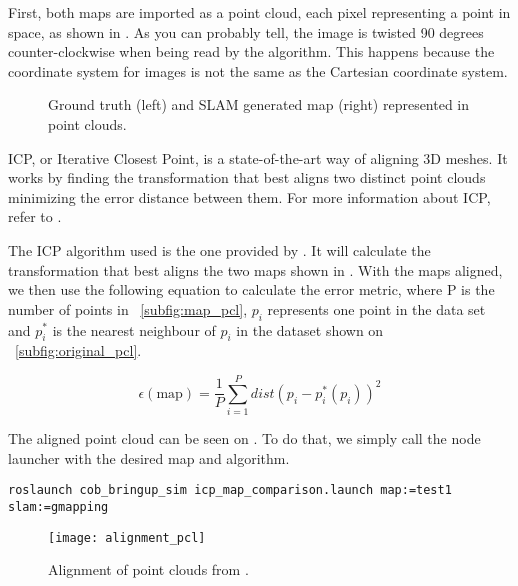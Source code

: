 First, both maps are imported as a point cloud, each pixel representing a point in space, as shown in . As you can probably tell, the image is twisted 90 degrees counter-clockwise when being read by the algorithm. This happens because the coordinate system for images is not the same as the Cartesian coordinate system.

\begin{figure}[!ht]
     \centering
     \hspace{0cm}
     \caption{Ground truth (left) and SLAM generated map (right) represented in point clouds.}
     \label{fig:point_cloud}
\end{figure}

ICP, or Iterative Closest Point, is a state-of-the-art way of aligning 3D meshes. It works by finding the transformation that best aligns two distinct point clouds minimizing the error distance between them. For more information about ICP, refer to \citeauthor{besl1992method}.

The ICP algorithm used is the one provided by \citeauthor{flannigan2019}. It will calculate the transformation that best aligns the two maps shown in . With the maps aligned, we then use the following equation to calculate the error metric, where P is the number of points in \figurename~\ref{subfig:map_pcl}, $p_i$ represents one point in the data set and $p_i^*$ is the nearest neighbour of $p_i$ in the dataset shown on \figurename~\ref{subfig:original_pcl}.

\begin{equation}
\epsilon(\text{map}) = \frac{1}{P} \sum_{i=1}^P dist(p_i - p_i^*(p_i))^2
\end{equation}

The aligned point cloud can be seen on . To do that, we simply call the node launcher with the desired map and algorithm.

\begin{verbatim}
roslaunch cob_bringup_sim icp_map_comparison.launch map:=test1 slam:=gmapping
\end{verbatim}

\begin{figure}[!ht]
    \centering
    \texttt{[image: alignment\_pcl]}
    \caption{Alignment of point clouds from .}
    \label{fig:alignment_pcl}
\end{figure}

